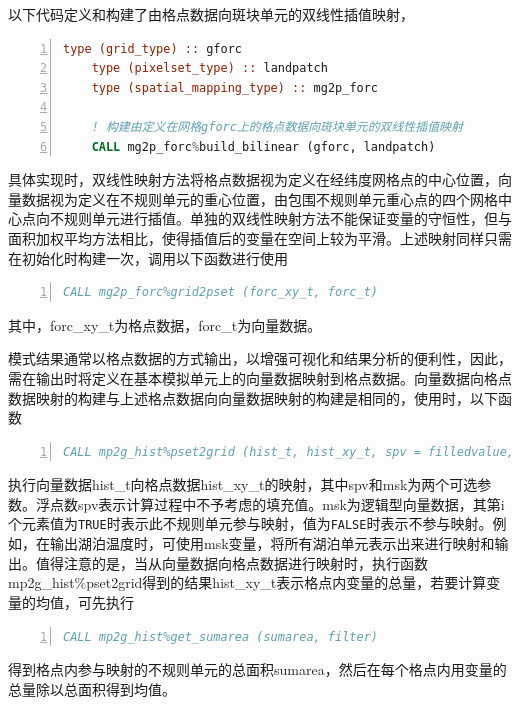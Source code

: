 以下代码定义和构建了由格点数据向斑块单元的双线性插值映射，
\begin{lstlisting}[language=fortran, basicstyle=\linespread{1.0}\footnotesize\ttfamily, commentstyle=\color{olive}, numbers=left, numberstyle=\tiny, xleftmargin=1.5em,xrightmargin=0em, aboveskip=1em]
    type (grid_type) :: gforc
    type (pixelset_type) :: landpatch
    type (spatial_mapping_type) :: mg2p_forc

    ! 构建由定义在网格gforc上的格点数据向斑块单元的双线性插值映射
    CALL mg2p_forc%build_bilinear (gforc, landpatch)
\end{lstlisting}
具体实现时，双线性映射方法将格点数据视为定义在经纬度网格点的中心位置，向量数据视为定义在不规则单元的重心位置，由包围不规则单元重心点的四个网格中心点向不规则单元进行插值。单独的双线性映射方法不能保证变量的守恒性，但与面积加权平均方法相比，使得插值后的变量在空间上较为平滑。上述映射同样只需在初始化时构建一次，调用以下函数进行使用
\begin{lstlisting}[language=fortran, basicstyle=\linespread{1.0}\footnotesize\ttfamily, commentstyle=\color{olive}, numbers=left, numberstyle=\tiny, xleftmargin=1.5em,xrightmargin=0em, aboveskip=1em]
    CALL mg2p_forc%grid2pset (forc_xy_t, forc_t)
\end{lstlisting}
其中，forc\_xy\_t为格点数据，forc\_t为向量数据。

模式结果通常以格点数据的方式输出，以增强可视化和结果分析的便利性，因此，需在输出时将定义在基本模拟单元上的向量数据映射到格点数据。向量数据向格点数据映射的构建与上述格点数据向向量数据映射的构建是相同的，使用时，以下函数
\begin{lstlisting}[language=fortran, basicstyle=\linespread{1.0}\footnotesize\ttfamily, commentstyle=\color{olive}, numbers=left, numberstyle=\tiny, xleftmargin=1.5em,xrightmargin=0em, aboveskip=1em]
    CALL mp2g_hist%pset2grid (hist_t, hist_xy_t, spv = filledvalue, msk = filter)
\end{lstlisting}
执行向量数据hist\_t向格点数据hist\_xy\_t的映射，其中spv和msk为两个可选参数。浮点数spv表示计算过程中不予考虑的填充值。msk为逻辑型向量数据，其第i个元素值为\texttt{TRUE}时表示此不规则单元参与映射，值为\texttt{FALSE}时表示不参与映射。例如，在输出湖泊温度时，可使用msk变量，将所有湖泊单元表示出来进行映射和输出。值得注意的是，当从向量数据向格点数据进行映射时，执行函数mp2g\_hist\%pset2grid得到的结果hist\_xy\_t表示格点内变量的总量，若要计算变量的均值，可先执行
\begin{lstlisting}[language=fortran, basicstyle=\linespread{1.0}\footnotesize\ttfamily, commentstyle=\color{olive}, numbers=left, numberstyle=\tiny, xleftmargin=1.5em,xrightmargin=0em, aboveskip=1em]
    CALL mp2g_hist%get_sumarea (sumarea, filter)
\end{lstlisting}
得到格点内参与映射的不规则单元的总面积sumarea，然后在每个格点内用变量的总量除以总面积得到均值。


